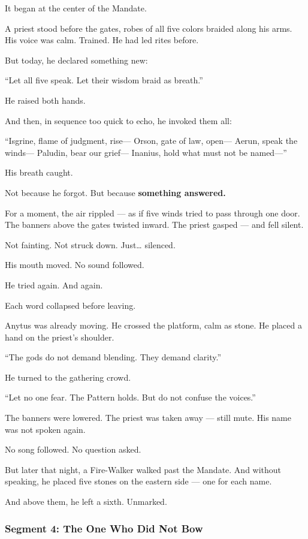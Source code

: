 \documentclass[9pt]{article}
\begin{document}
It began at the center of the Mandate.

A priest stood before the gates,  
robes of all five colors braided along his arms.  
His voice was calm. Trained.  
He had led rites before.

But today, he declared something new:

 “Let all five speak.  
 Let their wisdom braid as breath.”

He raised both hands.

And then, in sequence too quick to echo,  
he invoked them all:

 “Isgrine, flame of judgment, rise—  
Orson, gate of law, open—  
Aerun, speak the winds—  
Paludin, bear our grief—  
Inanius, hold what must not be named—”

His breath caught.

Not because he forgot.  
But because \textbf{something answered.}

For a moment, the air rippled — as if five winds tried to pass through one door.  
The banners above the gates twisted inward.  
The priest gasped — and fell silent.

Not fainting.  
Not struck down.  
Just… silenced.

His mouth moved.  
No sound followed.

He tried again.  
And again.

Each word collapsed before leaving.

Anytus was already moving.  
He crossed the platform, calm as stone.  
He placed a hand on the priest’s shoulder.

 “The gods do not demand blending.  
 They demand clarity.”

He turned to the gathering crowd.

 “Let no one fear.  
 The Pattern holds.  
 But do not confuse the voices.”

The banners were lowered.  
The priest was taken away — still mute.  
His name was not spoken again.

No song followed.  
No question asked.

But later that night, a Fire-Walker walked past the Mandate.  
And without speaking, he placed five stones on the eastern side —  
one for each name.

And above them, he left a sixth.  
Unmarked.

\newpage

\subsubsection*{Segment 4: The One Who Did Not Bow}
\end{document}
